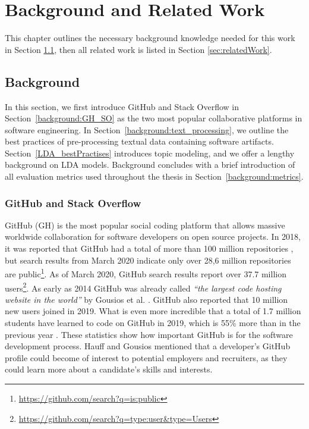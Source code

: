 \chapter{Background and Related Work\label{chap:relatedWork}}
    This chapter outlines the necessary background knowledge needed for this work in Section \ref{sec:background}, then all related work is listed in Section \ref{sec:relatedWork}.
    
\section{Background} \label{sec:background}

    In this section, we first introduce GitHub and Stack Overflow in Section~\ref{background:GH_SO} as the two most popular collaborative platforms in software engineering. In Section~\ref{background:text_processing}, we outline the best practices of pre-processing textual data containing software artifacts. Section~\ref{LDA_bestPractises} introduces topic modeling, and we offer a lengthy background on LDA models. Background concludes with a brief introduction of all evaluation metrics used throughout the thesis in Section~\ref{background:metrics}.
    
    \subsection{GitHub and Stack Overflow\label{background:GH_SO}}
        GitHub (GH) is the most popular social coding platform that allows massive worldwide collaboration for software developers on open source projects. In 2018, it was reported that GitHub had a total of more than 100 million repositories \cite{johnson_2018}, but search results from March 2020 indicate only over 28,6 million repositories are public\footnote{\url{https://github.com/search?q=is:public}}. As of March 2020, GitHub search results report over 37.7 million users\footnote{\url{https://github.com/search?q=type:user&type=Users}}. As early as 2014 GitHub was already called \emph{``the largest code hosting website in the world''} by Gousios et al. \cite{gousios2014lean}. GitHub also reported that 10 million new users joined in 2019. What is even more incredible that a total of 1.7 million students have learned to code on GitHub in 2019, which is 55\% more than in the previous year \cite{octoverse_2019}. These statistics show how important GitHub is for the software development process. Hauff and Gousios \cite{hauff2015matching} mentioned that a developer's GitHub profile could become of interest to potential employers and recruiters, as they could learn more about a candidate's skills and interests. 
    
